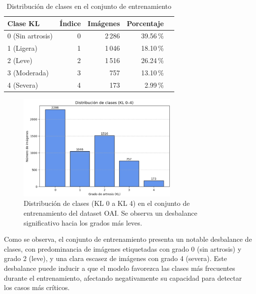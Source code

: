 \documentclass[11pt,spanish,listoffigures,listoftables]{tfgetsinf}
\begin{document}
\begin{itemize}
    \begin{table}[h]
        \centering
        \caption{Distribución de clases en el conjunto de entrenamiento}
        \label{tab:class_distribution}
        \begin{tabular}{lrrrr}
            \toprule
            \textbf{Clase KL} & \textbf{Índice} & \textbf{Imágenes} & \textbf{Porcentaje} \\
            \midrule
            0 (Sin artrosis) & 0 & 2\,286 & 39.56\,\% \\
            1 (Ligera) & 1 & 1\,046 & 18.10\,\% \\
            2 (Leve) & 2 & 1\,516 & 26.24\,\% \\
            3 (Moderada) & 3 & 757 & 13.10\,\% \\
            4 (Severa) & 4 & 173 & 2.99\,\% \\
            \bottomrule
        \end{tabular}
    \end{table}

    \begin{figure}[ht]
        \centering
        \includegraphics[width=0.7\textwidth]{class_distribution_train.png}
        \caption{Distribución de clases (KL 0 a KL 4) en el conjunto de entrenamiento del dataset OAI. Se observa un desbalance significativo hacia los grados más leves.}
        \label{fig:class_barplot}
    \end{figure}

    Como se observa, el conjunto de entrenamiento presenta un notable desbalance de clases, con predominancia de imágenes etiquetadas con 
    grado 0 (sin artrosis) y grado 2 (leve), y una clara escasez de imágenes con grado 4 (severa). Este desbalance puede inducir a que el modelo 
    favorezca las clases más frecuentes durante el entrenamiento, afectando negativamente su capacidad para detectar los casos más críticos. 


\end{itemize}
\end{document}
